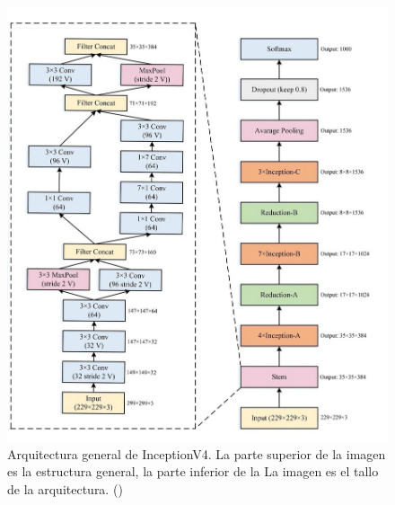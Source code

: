 \begin{itemize}
	\begin{figure}[H]
		\begin{center}
			\includegraphics[width=1\textwidth]{2/figures/cnn6.jpeg}
			\caption{ Arquitectura general de InceptionV4. La parte superior de la imagen es la estructura general, la parte inferior de la
				La imagen es el tallo de la arquitectura.
				(\cite{tecnica2})}
		\end{center}
	\end{figure}
	

\end{itemize}
